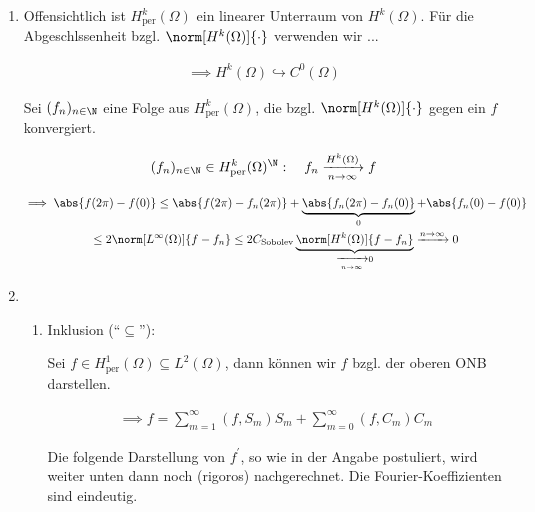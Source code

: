 \begin{solution}

\phantom{}


\begin{enumerate}[label = (\roman*)]

  \item Offensichtlich ist $H_\mathrm{per}^k(\Omega)$ ein linearer Unterraum von $H^k(\Omega)$.
  Für die Abgeschlssenheit bzgl. $\norm[H^k(\Omega)]{\cdot}$ verwenden wir ...


  \begin{align*}
    \implies
    H^k(\Omega) \hookrightarrow C^0(\Omega)
  \end{align*}

  Sei $(f_n)_{n \in \N}$ eine Folge aus $H_\mathrm{per}^k(\Omega)$, die bzgl. $\norm[H^k(\Omega)]{\cdot}$ gegen ein $f$ konvergiert.

  \begin{align*}
    (f_n)_{n \in \N} \in H_\mathrm{per}^k(\Omega)^\N:
    \quad
    f_n \xrightarrow[n \to \infty]{H^k(\Omega)} f
  \end{align*}

  \begin{multline*}
    \implies
    \abs{f(2 \pi) - f(0)}
    \leq
    \abs{f(2 \pi) - f_n(2 \pi)} + \underbrace{\abs{f_n(2 \pi) - f_n(0)}}_0 + \abs{f_n(0) - f(0)} \\
    \leq
    2 \norm[L^\infty(\Omega)]{f - f_n}
    \leq
    2 C_\mathrm{Sobolev} \underbrace{\norm[H^k(\Omega)]{f - f_n}}_{\xrightarrow[n \to \infty]{} 0}
    \xrightarrow[]{n \to \infty}
    0
  \end{multline*}

  \item

  \begin{enumerate}

    \item Inklusion (\enquote{$\subseteq$}):

    Sei $f \in H_\mathrm{per}^1(\Omega) \subseteq L^2(\Omega)$, dann können wir $f$ bzgl. der oberen ONB darstellen.

    \begin{align*}
      \implies
      f
      =
      \sum_{m=1}^\infty (f, S_m) S_m + \sum_{m=0}^\infty (f, C_m) C_m
    \end{align*}

    Die folgende Darstellung von $f^\prime$, so wie in der Angabe postuliert, wird weiter unten dann noch (rigoros) nachgerechnet.
    Die Fourier-Koeffizienten sind eindeutig.


\end{enumerate}
\end{enumerate}
\end{solution}
